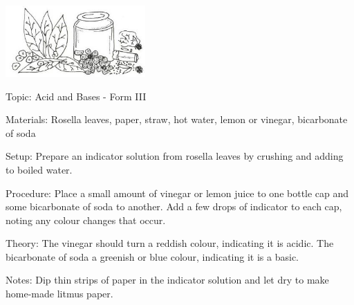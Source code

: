 \begin{multicols}{2}
\begin{center}
\includegraphics[width=0.4\textwidth]{./img/vso/making-indicators.jpg}
\end{center}

\begin{description*}
\item[Topic:]{Acid and Bases - Form III}
\item[Materials:]{Rosella leaves, paper, straw, hot water, lemon or vinegar, bicarbonate of soda}
\item[Setup:]{Prepare an indicator solution from rosella leaves by crushing and adding to boiled water.}
\item[Procedure:]{Place a small amount of vinegar or lemon juice to one bottle cap and some bicarbonate of soda to another. Add a few drops of indicator to each cap, noting any colour changes that occur.}
\item[Theory:]{The vinegar should turn a reddish colour, indicating it is acidic. The bicarbonate of soda a greenish or blue colour, indicating it is a basic.}
\item[Notes:]{Dip thin strips of paper in the indicator solution and let dry to make home-made litmus paper.}
\end{description*}

\end{multicols}
